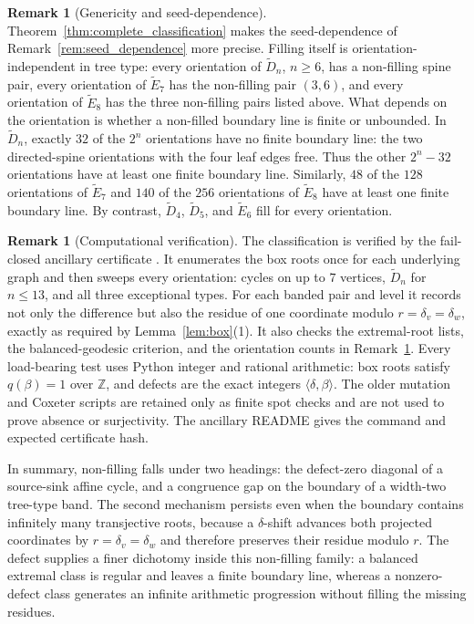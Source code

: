 \documentclass[11pt, a4paper]{amsart}
\theoremstyle{definition}
\newtheorem{remark}[theorem]{Remark}
\newcommand{\ZZ}{\mathbb{Z}}
\begin{document}
\begin{remark}[Genericity and seed-dependence]
\label{rem:generic}
Theorem~\ref{thm:complete_classification} makes the seed-dependence of
Remark~\ref{rem:seed_dependence} more precise. Filling itself is
orientation-independent in tree type: every orientation of
$\widetilde D_n$, $n\geq6$, has a non-filling spine pair, every orientation
of $\widetilde E_7$ has the non-filling pair $(3,6)$, and every orientation
of $\widetilde E_8$ has the three non-filling pairs listed above. What
depends on the orientation is whether a non-filled boundary line is finite
or unbounded. In $\widetilde D_n$, exactly $32$ of the $2^n$ orientations
have no finite boundary line: the two directed-spine orientations with the
four leaf edges free. Thus the other $2^n-32$ orientations have at least one
finite boundary line. Similarly, $48$ of the $128$ orientations of
$\widetilde E_7$ and $140$ of the $256$ orientations of
$\widetilde E_8$ have at least one finite boundary line. By contrast,
$\widetilde D_4$, $\widetilde D_5$, and $\widetilde E_6$ fill for every
orientation.
\end{remark}

\begin{remark}[Computational verification]
\label{rem:computation}
The classification is verified by the fail-closed ancillary certificate
. It enumerates the box roots
once for each underlying graph and then sweeps every orientation: cycles on
up to $7$ vertices, $\widetilde D_n$ for $n\leq13$, and all three
exceptional types. For each banded pair and level it records not only the
difference but also the residue of one coordinate modulo
$r=\delta_v=\delta_w$, exactly as required by Lemma~\ref{lem:box}(1). It
also checks the extremal-root lists, the balanced-geodesic criterion, and
the orientation counts in Remark~\ref{rem:generic}. Every load-bearing test
uses Python integer and rational arithmetic: box roots satisfy
$q(\beta)=1$ over $\ZZ$, and defects are the exact integers
$\langle\delta,\beta\rangle$. The older mutation and Coxeter scripts are
retained only as finite spot checks and are not used to prove absence or
surjectivity. The ancillary README gives the command and expected
certificate hash.
\end{remark}

In summary, non-filling falls under two headings: the defect-zero diagonal
of a source-sink affine cycle, and a congruence gap on the boundary of a
width-two tree-type band. The second mechanism persists even when the
boundary contains infinitely many transjective roots, because a
$\delta$-shift advances both projected coordinates by
$r=\delta_v=\delta_w$ and therefore preserves their residue modulo $r$.
The defect supplies a finer dichotomy inside this non-filling family: a
balanced extremal class is regular and leaves a finite boundary line,
whereas a nonzero-defect class generates an infinite arithmetic progression
without filling the missing residues.
\end{document}
